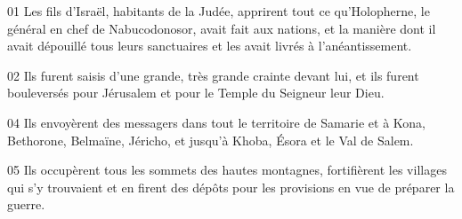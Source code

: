 01 Les fils d'Israël, habitants de la Judée, apprirent tout ce qu'Holopherne, le général en chef de Nabucodonosor, avait fait aux nations, et la manière dont il avait dépouillé tous leurs sanctuaires et les avait livrés à l'anéantissement.

02 Ils furent saisis d'une grande, très grande crainte devant lui, et ils furent bouleversés pour Jérusalem et pour le Temple du Seigneur leur Dieu.

04 Ils envoyèrent des messagers dans tout le territoire de Samarie et à Kona, Bethorone, Belmaïne, Jéricho, et jusqu'à Khoba, Ésora et le Val de Salem.

05 Ils occupèrent tous les sommets des hautes montagnes, fortifièrent les villages qui s'y trouvaient et en firent des dépôts pour les provisions en vue de préparer la guerre.
